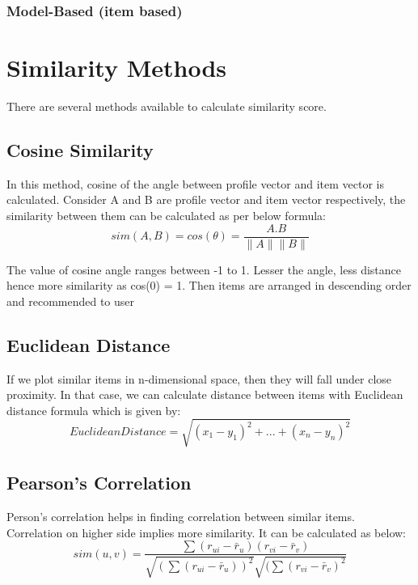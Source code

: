 \subsubsection{Model-Based (item based)}


\section{Similarity Methods}
There are several methods available to calculate similarity score.
\\

\subsection{Cosine Similarity}
In this method, cosine of the angle between profile vector and item vector is calculated. Consider A and B are profile vector and item vector respectively, the similarity between them can be calculated as per below formula:
\\

\begin{equation}
sim(A,B) = cos(\theta) =\frac {A.B}{\parallel A \parallel \parallel B \parallel}
\end{equation}

\noindent The value of cosine angle ranges between -1 to 1. Lesser the angle, less distance hence more similarity as cos(0) = 1. Then items are arranged in descending order and recommended to user
\\
\subsection{Euclidean Distance}
If we plot similar items in n-dimensional space, then they will fall under close proximity. In that case, we can calculate distance between items with Euclidean distance formula which is given by:
\\
\begin{equation}
Euclidean Distance = \sqrt{(x_1 - y_1)^2 + ... + (x_n - y_n)^2}
\end{equation}


\subsection{Pearson’s Correlation}
Person’s correlation helps in finding correlation between similar items. Correlation on higher side implies more similarity. It can be calculated as below:
\\
\begin{equation}
sim(u,v) = \frac{\sum (r_{ui} - \bar{r}_u) (r_{vi} - \bar{r}_v )}{\sqrt{(\sum (r_{ui} - \bar{r}_u))^2} \sqrt{(\sum (r_{vi} - \bar{r}_v )^2}}
\end{equation}
\\
